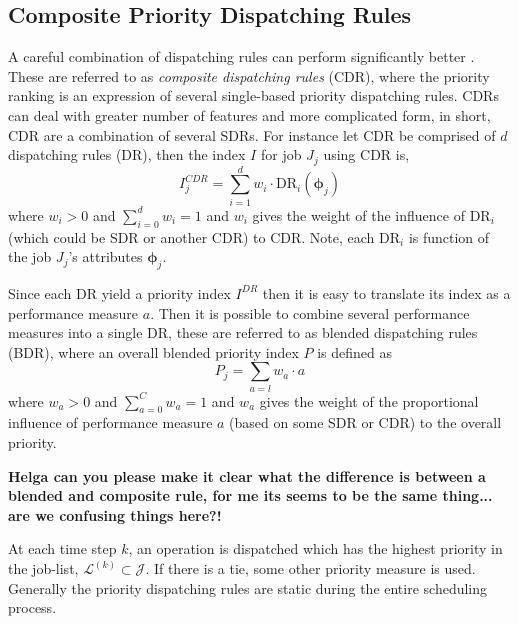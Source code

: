 \documentclass[smallextended]{svjour3}
\renewcommand{\vphi}{\bm \phi}
\begin{document}
\subsection{Composite Priority Dispatching Rules}\label{sec:CDR}
A careful combination of dispatching rules can perform significantly
better \cite{Jayamohan04}. These are referred to as \emph{composite
  dispatching rules} (CDR), where the priority ranking is an
expression of several single-based priority dispatching rules. CDRs
can deal with greater number of features and more complicated form, in
short, CDR are a combination of several SDRs. For instance let CDR be
comprised of $d$ dispatching rules (DR), then the index $I$ for job $J_j$ using CDR is,
\begin{equation}
  I_j^{CDR} = \sum_{i=1}^d w_i \cdot \text{DR}_i(\vphi_j) \label{eq:CDR}
\end{equation}
where $w_i>0$ and $\sum_{i=0}^d w_i = 1$ and $w_i$ gives the weight of
the influence of $\text{DR}_i$ (which could be SDR or another CDR) to
CDR. Note, each $\text{DR}_i$ is function of the job $J_j$'s attributes
 $\vphi_j$.   
	
Since each DR yield a priority index $I^{DR}$ then it is easy to
translate its index as a performance measure $a$. Then it is possible
to combine several performance measures into a single DR, these are
referred to as blended dispatching rules (BDR), where an overall
blended priority index $P$ is defined as
\begin{equation}
  P_j = \sum_{a=l} w_a \cdot a 
\end{equation}
where $w_a>0$ and $\sum_{a=0}^C w_a = 1$ and $w_a$ gives the weight of
the proportional influence of performance measure $a$ (based on some
SDR or CDR) to the overall priority.

{\bf Helga can you please make it clear what the difference is between a blended and composite rule, for me its seems to be the same thing... are we confusing things here?!}

At each time step $k$, an operation is dispatched which has the
highest priority in the job-list,
$\mathcal{L}^{(k)}\subset\mathcal{J}$.  If there is a tie, some other priority measure
is used. Generally the priority dispatching rules are static during
the entire scheduling process.
	
\end{document}
